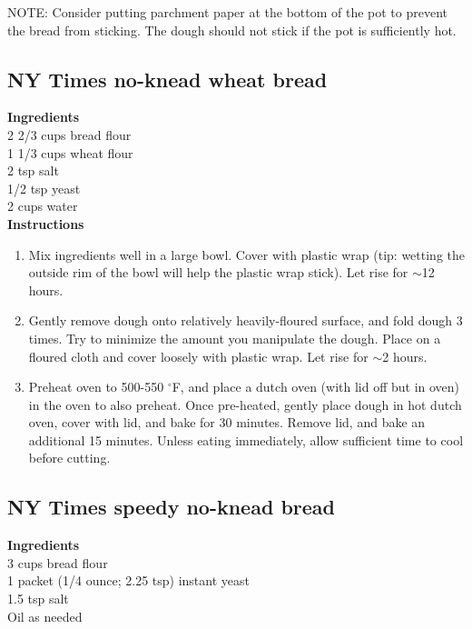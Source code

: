 \documentclass{article}
\numberwithin{figure}{section}
\numberwithin{equation}{section}
\begin{document}
NOTE: Consider putting parchment paper at the bottom of the pot to prevent the bread from sticking. The dough should not stick if the pot is sufficiently hot.


\pagebreak
\subsection{NY Times no-knead wheat bread}
{\bf Ingredients}\\
2 2/3 cups bread flour\\
1 1/3 cups wheat flour\\
2 tsp salt\\
1/2 tsp yeast\\
2 cups water\\

{\bf Instructions}
\begin{enumerate}
\item Mix ingredients well in a large bowl. Cover with plastic wrap (tip: wetting the outside rim of the bowl will help the plastic wrap stick). Let rise for $\sim$12 hours.

\item Gently remove dough onto relatively heavily-floured surface, and fold dough 3 times. Try to minimize the amount you manipulate the dough. Place on a floured cloth and cover loosely with plastic wrap. Let rise for $\sim$2 hours.

\item Preheat oven to 500-550 $^{\circ}$F, and place a dutch oven (with lid off but in oven) in the oven to also preheat. Once pre-heated, gently place dough in hot dutch oven, cover with lid, and bake for 30 minutes. Remove lid, and bake an additional 15 minutes. Unless eating immediately, allow sufficient time to cool before cutting.

\end{enumerate}


\pagebreak
\subsection{NY Times speedy no-knead bread}
{\bf Ingredients}\\
3 cups bread flour\\
1 packet (1/4 ounce; 2.25 tsp) instant yeast\\
1.5 tsp salt\\
Oil as needed\\
\end{document}
